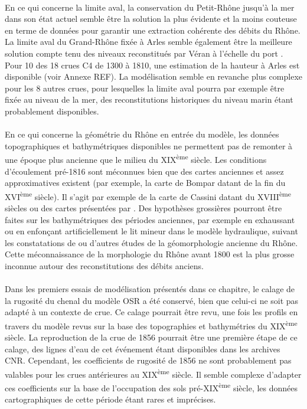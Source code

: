 	\paragraph{} En ce qui concerne la limite aval, la conservation du Petit-Rhône jusqu'à la mer dans son état actuel semble être la solution la plus évidente et la moins couteuse en terme de données pour garantir une extraction cohérente des débits du Rhône. La limite aval du Grand-Rhône fixée à Arles semble également être la meilleure solution compte tenu des niveaux reconstitués par Véran à l'échelle du port \citep{pichard_les_1995}. Pour 10 des 18 crues C4 de 1300 à 1810, une estimation de la hauteur à Arles est disponible (voir Annexe REF). La modélisation semble en revanche plus complexe pour les 8 autres crues, pour lesquelles la limite aval pourra par exemple être fixée au niveau de la mer, des reconstitutions historiques du niveau marin étant probablement disponibles.
	
	\paragraph{} En ce qui concerne la géométrie du Rhône en entrée du modèle, les données topographiques et bathymétriques disponibles ne permettent pas de remonter à une époque plus ancienne que le milieu du XIX\textsuperscript{ème} siècle. Les conditions d'écoulement pré-1816 sont méconnues bien que des cartes anciennes et assez approximatives existent (par exemple, la carte de Bompar datant de la fin du XVI\textsuperscript{ème} siècle). Il s'agit par exemple de la carte de Cassini datant du XVIII\textsuperscript{ème} siècles ou des cartes présentées par \citet{pichard_sept_2014}. Des hypothèses grossières pourront être faites sur les bathymétriques des périodes anciennes, par exemple en exhaussant ou en enfonçant artificiellement le lit mineur dans le modèle hydraulique, suivant les constatations de \citet{pichard_sept_2014} ou d'autres études de la géomorphologie ancienne du Rhône. Cette méconnaissance de la morphologie du Rhône avant 1800 est la plus grosse inconnue autour des reconstitutions des débits anciens.
	
	\paragraph{} Dans les premiers essais de modélisation présentés dans ce chapitre, le calage de la rugosité du chenal du modèle OSR a été conservé, bien que celui-ci ne soit pas adapté à un contexte de crue. Ce calage pourrait être revu, une fois les profils en travers du modèle revus sur la base des topographies et bathymétries du XIX\textsuperscript{ème} siècle. La reproduction de la crue de 1856 pourrait être une première étape de ce calage, des lignes d'eau de cet événement étant disponibles dans les archives CNR. Cependant, les coefficients de rugosité de 1856 ne sont probablement pas valables pour les crues antérieures au XIX\textsuperscript{ème} siècle. Il semble complexe d'adapter ces coefficients sur la base de l'occupation des sols pré-XIX\textsuperscript{ème} siècle, les données cartographiques de cette période étant rares et imprécises. 
	
